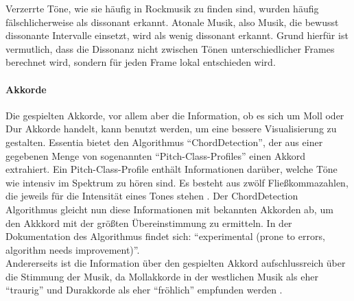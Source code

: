 \documentclass[11pt,a4paper]{article}
\begin{document}
\noindent
Verzerrte Töne, wie sie häufig in Rockmusik zu finden sind, wurden häufig fälschlicherweise als dissonant erkannt. Atonale Musik, also Musik, die bewusst dissonante Intervalle einsetzt, wird als wenig dissonant erkannt. Grund hierfür ist vermutlich, dass die Dissonanz nicht zwischen Tönen unterschiedlicher Frames berechnet wird, sondern für jeden Frame lokal entschieden wird.

\paragraph{Akkorde}
Die gespielten Akkorde, vor allem aber die Information, ob es sich um Moll oder Dur Akkorde handelt, kann benutzt werden, um eine bessere Visualisierung zu gestalten. Essentia bietet den Algorithmus ``ChordDetection'', der aus einer gegebenen Menge von sogenannten ``Pitch-Class-Profiles'' einen Akkord extrahiert. Ein Pitch-Class-Profile enthält Informationen darüber, welche Töne wie intensiv im Spektrum zu hören sind. Es besteht aus zwölf Fließkommazahlen, die jeweils für die Intensität eines Tones stehen \cite{e6fe2ea94b8d448139e05e3d36c0ffd5e82905dc87f719492ff3872650c667d9}. Der ChordDetection Algorithmus gleicht nun diese Informationen mit bekannten Akkorden ab, um den Akkkord mit der größten Übereinstimmung zu ermitteln. In der Dokumentation des Algorithmus findet sich: ``experimental (prone to errors, algorithm needs improvement)''\cite{EssentiaChordDetection}.\\
Andererseits ist die Information über den gespielten Akkord aufschlussreich über die Stimmung der Musik, da Mollakkorde in der westlichen Musik als eher ``traurig'' und Durakkorde als eher ``fröhlich'' empfunden werden \cite{dalla2001developmental}.
\end{document}
